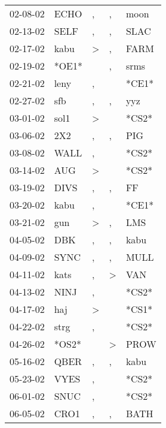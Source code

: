 \begin{supertabular}{lllll}
 02-08-02 &   ECHO &                , &             , &   moon \\
 02-13-02 &   SELF &                , &             , &   SLAC \\
 02-17-02 &   kabu &     \textgreater &             , &   FARM \\
 02-19-02 &  *OE1* &                  &             , &   srms \\
 02-21-02 &   leny &                , &               &  *CE1* \\
 02-27-02 &    sfb &                , &             , &    yyz \\
 03-01-02 &   sol1 &     \textgreater &               &  *CS2* \\
 03-06-02 &    2X2 &                , &             , &    PIG \\
 03-08-02 &   WALL &                , &               &  *CS2* \\
 03-14-02 &    AUG &     \textgreater &               &  *CS2* \\
 03-19-02 &   DIVS &                , &             , &     FF \\
 03-20-02 &   kabu &                , &               &  *CE1* \\
 03-21-02 &    gun &     \textgreater &             , &    LMS \\
 04-05-02 &    DBK &                , &             , &   kabu \\
 04-09-02 &   SYNC &                , &             , &   MULL \\
 04-11-02 &   kats &                , &  \textgreater &    VAN \\
 04-13-02 &   NINJ &                , &               &  *CS2* \\
 04-17-02 &    haj &     \textgreater &               &  *CS1* \\
 04-22-02 &   strg &                , &               &  *CS2* \\
 04-26-02 &  *OS2* &                  &  \textgreater &   PROW \\
 05-16-02 &   QBER &                , &             , &   kabu \\
 05-23-02 &   VYES &                , &               &  *CS2* \\
 06-01-02 &   SNUC &                , &               &  *CS2* \\
 06-05-02 &   CRO1 &                , &             , &   BATH \\

\end{supertabular}
